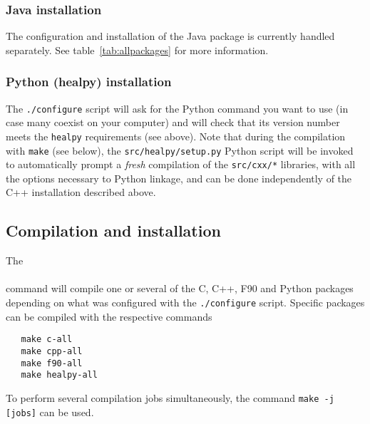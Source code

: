 \documentclass[12pt,twoside]{article}
\begin{document}
\subsubsection{Java installation}
The configuration and installation of the \healpix Java package is currently
handled separately. See table~\ref{tab:allpackages} for more information.

\subsubsection{Python (healpy) installation}
The \texttt{./configure} script will ask for the Python command you want to use 
(in case many coexist on your computer) and will check that its version number meets the \texttt{healpy} requirements (see above).
Note that during the compilation with \texttt{make} (see below), the 
 \texttt{src/healpy/setup.py} Python script will be invoked to automatically prompt a {\em fresh} compilation of the
 \texttt{src/cxx/*} libraries, with all the options necessary to Python linkage, and
 can be done independently of the C++ installation described above.

\subsection{Compilation and installation}

The \\
 \\
command will compile one or several of the C, C++, F90 and Python packages
depending on what was configured with the \texttt{./configure} script.
Specific packages can be compiled with the respective commands 
\begin{verbatim}
   make c-all
   make cpp-all
   make f90-all
   make healpy-all
\end{verbatim}

To perform several compilation jobs simultaneously, the command \texttt{make -j [jobs]}
can be used.
\end{document}
